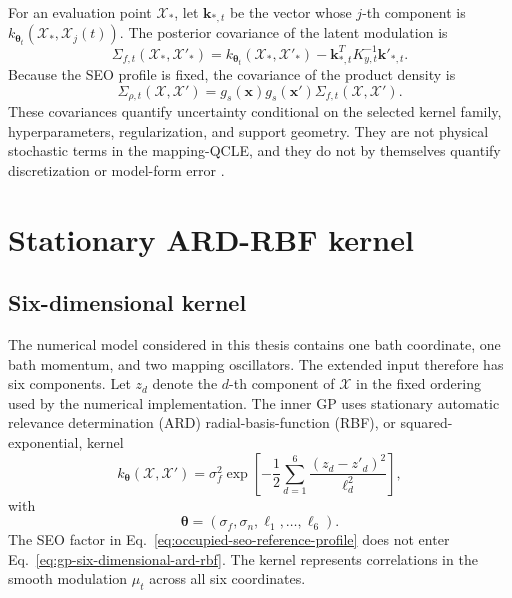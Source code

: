 \documentclass[
  11pt,
  letterpaper,
  onehalfspacing,
  normalmargins,
  equalmargins,
  oneside
]{ut-thesis}
\begin{document}
For an evaluation point \(\boldsymbol{\mathcal X}_\ast\), let
\(\mathbf k_{\ast,t}\) be the vector whose \(j\)-th component is
\(k_{\boldsymbol\theta_t}(\boldsymbol{\mathcal X}_\ast,
\boldsymbol{\mathcal X}_j(t))\). The posterior covariance of the latent modulation is
\begin{equation}
\Sigma_{f,t}
\left(
\boldsymbol{\mathcal X}_\ast,
\boldsymbol{\mathcal X}'_\ast
\right)
=
 k_{\boldsymbol\theta_t}
\left(
\boldsymbol{\mathcal X}_\ast,
\boldsymbol{\mathcal X}'_\ast
\right)
-
\mathbf k_{\ast,t}^{T}
K_{y,t}^{-1}
\mathbf k'_{\ast,t}.
\label{eq:gp-modulation-posterior-covariance}
\end{equation}
Because the SEO profile is fixed, the covariance of the product density is
\begin{equation}
\Sigma_{\rho,t}
\left(
\boldsymbol{\mathcal X},
\boldsymbol{\mathcal X}'
\right)
=
 g_s(\mathbf x)
 g_s(\mathbf x')
\Sigma_{f,t}
\left(
\boldsymbol{\mathcal X},
\boldsymbol{\mathcal X}'
\right).
\label{eq:gp-product-density-covariance}
\end{equation}
These covariances quantify uncertainty conditional on the selected kernel
family, hyperparameters, regularization, and support geometry. They are not
physical stochastic terms in the mapping-QCLE, and they do not by themselves
quantify discretization or model-form error
\cite{Cockayne2017PDEConstrained,CockayneOatesSullivanGirolami2019}.


\section{Stationary ARD-RBF kernel}
\label{sec:kernel-choice-smoothness}

\subsection{Six-dimensional kernel}
\label{subsec:ard-squared-exponential-kernel}

The numerical model considered in this thesis contains one bath coordinate,
one bath momentum, and two mapping oscillators. The extended input therefore
has six components. Let \(z_d\) denote the \(d\)-th component of
\(\boldsymbol{\mathcal X}\) in the fixed ordering used by the numerical
implementation. The inner GP uses stationary automatic relevance
determination (ARD) radial-basis-function (RBF), or squared-exponential,
kernel
\begin{equation}
 k_{\boldsymbol\theta}
\left(
\boldsymbol{\mathcal X},
\boldsymbol{\mathcal X}'
\right)
=
\sigma_f^2
\exp\left[
-
\frac{1}{2}
\sum_{d=1}^{6}
\frac{(z_d-z'_d)^2}{\ell_d^2}
\right],
\label{eq:gp-six-dimensional-ard-rbf}
\end{equation}
with
\begin{equation}
\boldsymbol\theta
=
\left(
\sigma_f,
\sigma_n,
\ell_1,\ldots,\ell_6
\right).
\label{eq:gp-hyperparameter-vector}
\end{equation}
The SEO factor in Eq.~\eqref{eq:occupied-seo-reference-profile} does not enter
Eq.~\eqref{eq:gp-six-dimensional-ard-rbf}. The kernel represents correlations
in the smooth modulation \(\mu_t\) across all six coordinates.
\end{document}
